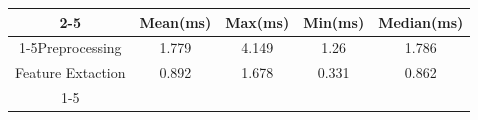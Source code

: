 \documentclass{standalone}
\begin{document}
 
 \begin{tabular}{|c |c |c |c |c |}
\cline{2-5}\cline{2-5} \multicolumn{1}{c |}{ } & Mean(ms) & Max(ms) & Min(ms) & Median(ms)\\ 
\cline{1-5}Preprocessing & 1.779 & 4.149 & 1.26 & 1.786\\ 
 \hhline{|=|=|=|=|=|}Feature Extaction & 0.892 & 1.678 & 0.331 & 0.862\\ 
 \cline{1-5}\hline \end{tabular}
 
\end{document}
